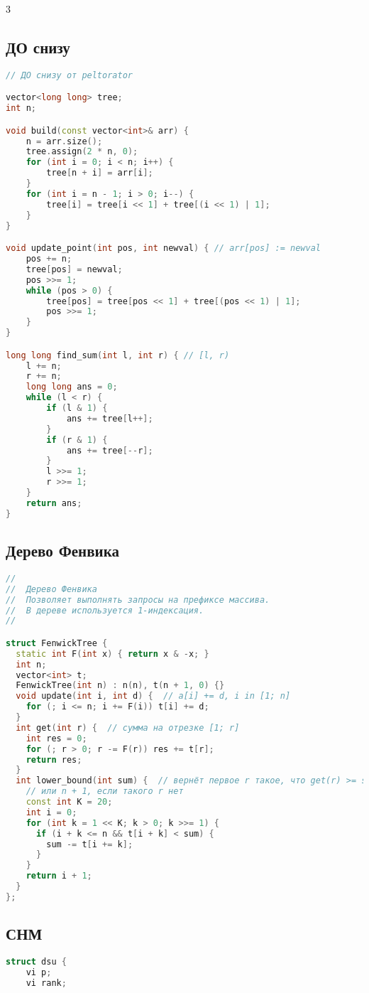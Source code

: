 \documentclass[10pt,a4paper,landscape,twosided]{extarticle}
\begin{document}
\begin{multicols}{3}
\subsection{ДО снизу}
\begin{lstlisting}[language=C++]
// ДО снизу от peltorator

vector<long long> tree;
int n;

void build(const vector<int>& arr) {
    n = arr.size();
    tree.assign(2 * n, 0);
    for (int i = 0; i < n; i++) {
        tree[n + i] = arr[i];
    }
    for (int i = n - 1; i > 0; i--) {
        tree[i] = tree[i << 1] + tree[(i << 1) | 1];
    }
}

void update_point(int pos, int newval) { // arr[pos] := newval
    pos += n;
    tree[pos] = newval;
    pos >>= 1;
    while (pos > 0) {
        tree[pos] = tree[pos << 1] + tree[(pos << 1) | 1];
        pos >>= 1;
    }
}

long long find_sum(int l, int r) { // [l, r)
    l += n;
    r += n;
    long long ans = 0;
    while (l < r) {
        if (l & 1) {
            ans += tree[l++];
        }
        if (r & 1) {
            ans += tree[--r];
        }
        l >>= 1;
        r >>= 1;
    }
    return ans;
}
\end{lstlisting}

\subsection{Дерево Фенвика}
\begin{lstlisting}[language=C++]
//
//  Дерево Фенвика
//  Позволяет выполнять запросы на префиксе массива.
//  В дереве используется 1-индексация.
//

struct FenwickTree {
  static int F(int x) { return x & -x; }
  int n;
  vector<int> t;
  FenwickTree(int n) : n(n), t(n + 1, 0) {}
  void update(int i, int d) {  // a[i] += d, i in [1; n]
    for (; i <= n; i += F(i)) t[i] += d;
  }
  int get(int r) {  // сумма на отрезке [1; r]
    int res = 0;
    for (; r > 0; r -= F(r)) res += t[r];
    return res;
  }
  int lower_bound(int sum) {  // вернёт первое r такое, что get(r) >= sum
    // или n + 1, если такого r нет
    const int K = 20;
    int i = 0;
    for (int k = 1 << K; k > 0; k >>= 1) {
      if (i + k <= n && t[i + k] < sum) {
        sum -= t[i += k];
      }
    }
    return i + 1;
  }
};
\end{lstlisting}

\subsection{СНМ}
\begin{lstlisting}[language=C++]
struct dsu {
    vi p;
    vi rank;


\end{lstlisting}
\end{multicols}
\end{document}
